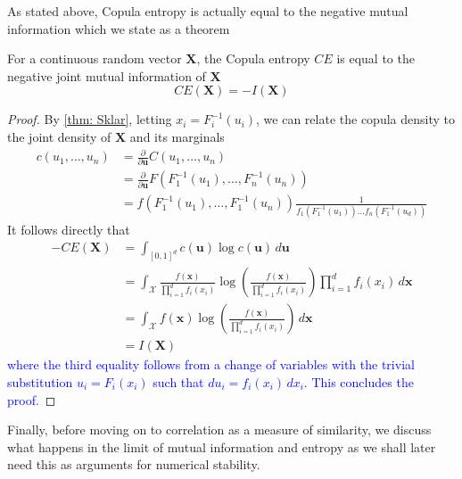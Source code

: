 \documentclass[../Thesis.tex]{subfiles}
\begin{document}
As stated above, Copula entropy is actually equal to the negative mutual information which we state as a theorem
\begin{theorem}\label{thm:copula entropy equals mutual information}
    For a continuous random vector $\boldsymbol{X}$, the Copula entropy $CE$ is equal to the negative joint mutual information of $\boldsymbol{X}$
    $$CE\left(\boldsymbol{X}\right) = - I\left(\boldsymbol{X}\right)$$
\end{theorem}
\begin{proof}
    By \autoref{thm: Sklar}, letting $x_i = F_i^{-1}\left(u_i\right)$, we can relate the copula density to the joint density of $\boldsymbol{X}$ and its marginals
    \begin{align*}
        c(u_1,\dots , u_n) & = \frac{\partial}{\partial \mathbf{u}} C(u_1,\dots,u_n)                                                                                                                   \\
                           & = \frac{\partial}{\partial \mathbf{u}} F\left(F_1^{-1}\left(u_1\right), \dots, F_n^{-1}\left(u_n\right)\right)                                                            \\
                           & = f\left(F_1^{-1}\left(u_1\right),\dots, F_1^{-1}\left(u_n\right)\right) \frac{1}{f_1\left(F_1^{-1}\left(u_1\right)\right)\dots f_n\left(F_1^{-1}\left(u_d\right)\right)}
    \end{align*}
    It follows directly that
    \begin{align*}
        -CE\left(\boldsymbol{X}\right) & = \int_{[0,1]^d} c\left(\boldsymbol{u}\right) \log c\left(\boldsymbol{u}\right) \, d\boldsymbol{u}                                                                                                                        \\
                                       & =  \int_{\mathcal{X}} \frac{f(\boldsymbol{x})}{\prod_{i=1}^{d} f_i\left(x_i\right)} \log\left(\frac{f(\boldsymbol{x})}{\prod_{i=1}^{d} f_i\left(x_i\right)}\right) \prod_{i=1}^{d} f_i\left(x_i\right) \, d\boldsymbol{x} \\
                                       & = \int_{\mathcal{X}} f(\boldsymbol{x}) \log\left(\frac{f(\boldsymbol{x})}{\prod_{i=1}^{d} f_i\left(x_i\right)}\right) \, d\boldsymbol{x}                                                                                  \\
                                       & = I\left(\boldsymbol{X}\right)
    \end{align*}
    \textcolor{blue}{where the third equality follows from a change of variables with the trivial substitution $u_i = F_i(x_i)$ such that $du_i = f_i(x_i)\,dx_i$. This concludes the proof.}
\end{proof}
Finally, before moving on to correlation as a measure of similarity, we discuss what happens in the limit of mutual information and entropy as we shall later need this as arguments for numerical stability.
\end{document}

